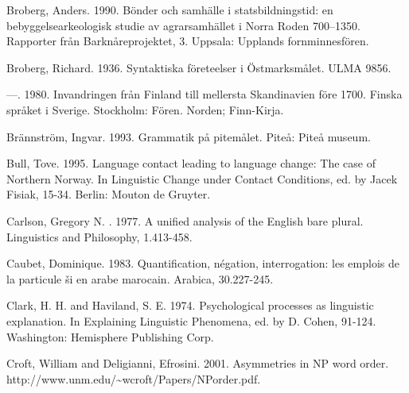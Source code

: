 Broberg, Anders. 1990. Bönder och samhälle i statsbildningstid: en bebyggelsearkeologisk studie av agrarsamhället i Norra Roden 700–1350. Rapporter från Barknåreprojektet, 3. Uppsala: Upplands fornminnesfören.


Broberg, Richard. 1936. Syntaktiska företeelser i Östmarksmålet. ULMA 9856.


—. 1980. Invandringen från Finland till mellersta Skandinavien före 1700. Finska språket i Sverige. Stockholm: Fören. Norden; Finn-Kirja.


Brännström, Ingvar. 1993. Grammatik på pitemålet. Piteå: Piteå museum.


Bull, Tove. 1995. Language contact leading to language change: The case of Northern Norway. In Linguistic Change under Contact Conditions, ed. by Jacek Fisiak, 15-34. Berlin: Mouton de Gruyter.


Carlson, Gregory N. . 1977. A unified analysis of the English bare plural. Linguistics and Philosophy, 1.413-458.


Caubet, Dominique. 1983. Quantification, négation, interrogation: les emplois de la particule {\textquotedbl}ši{\textquotedbl} en arabe marocain. Arabica, 30.227-245.


Clark, H. H. and Haviland, S. E. 1974. Psychological processes as linguistic explanation. In Explaining Linguistic Phenomena, ed. by D. Cohen, 91-124. Washington: Hemisphere Publishing Corp.


Croft, William and Deligianni, Efrosini. 2001. Asymmetries in NP word order. http://www.unm.edu/\~{}wcroft/Papers/NPorder.pdf. 


